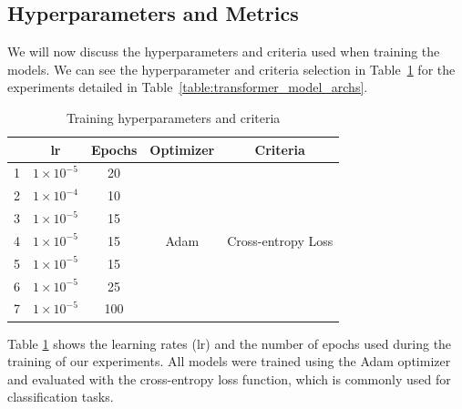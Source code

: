 \subsection{Hyperparameters and Metrics} \label{section:hyperparameters-metrics}

We will now discuss the hyperparameters and criteria used when training the models. We can see the hyperparameter and criteria selection in Table~\ref{table:training_hparams} for the experiments detailed in Table~\ref{table:transformer_model_archs}.

\begin{table}[h!]
\centering
\begin{tabular}{c || c c c c}
\toprule
 & lr & Epochs & Optimizer & Criteria \\
\midrule
1 & $1\times10^{-5}$ & 20 & \multirow{7}{*}{Adam} & \multirow{7}{*}{Cross-entropy Loss} \\
2 & $1\times10^{-4}$ & 10 & & \\
3 & $1\times10^{-5}$ & 15 & & \\
4 & $1\times10^{-5}$ & 15 & & \\
5 & $1\times10^{-5}$ & 15 & & \\
6 & $1\times10^{-5}$ & 25 & & \\
7 & $1\times10^{-5}$ & 100 & & \\
\bottomrule
\end{tabular}
\caption{Training hyperparameters and criteria}
\label{table:training_hparams}
\end{table}

Table \ref{table:training_hparams} shows the learning rates (lr) and the number of epochs used during the training of our experiments. All models were trained using the Adam optimizer \cite{adam} and evaluated with the cross-entropy loss function, which is commonly used for classification tasks.

